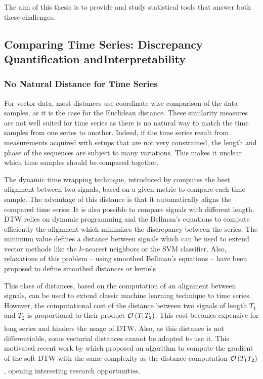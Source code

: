 \documentclass[../thesis.tex]{subfiles}
\begin{document}
The aim of this thesis is to provide and study statistical tools that answer both these challenges.




\subsection[Comparing Time Series: Discrepancy Quantification and\\Interpretability]{%
			Comparing Time Series: Discrepancy Quantification and\linebreak[1]Interpretability}
\label{sub:ts_stat}


\subsubsection{No Natural Distance for Time Series}
\label{ssub:ts:no_dist}


For vector data, most distances use coordinate-wise comparison of the data samples, as it is the case for the Euclidean distance. These similarity measures are not well suited for time series as there is no natural way to match the time samples from one series to another. Indeed, if the time series result from measurements acquired with setups that are not very constrained, the length and phase of the sequences are subject to many variations. This makes it unclear which time samples should be compared together.



The dynamic time wrapping technique, introduced by \citet{Sakoe1971} computes the best alignment between two signals, based on a given metric to compare each time sample. The advantage of this distance is that it automatically aligns the compared time series. It is also possible to compare signals with different length. DTW relies on dynamic programming and the Bellman's equations \citep{Bellman1952} to compute efficiently the alignment which minimizes the discrepancy between the series. The minimum value defines a distance between signals which can be used to extend vector methods like the $k$-nearest neighbors or the SVM classifier. Also, relaxations of this problem -- using smoothed Bellman's equations -- have been proposed to define smoothed distances \citep{Bahl1975} or kernels \citep{Saigo2004}.


This class of distances, based on the computation of an alignment between signals, can be used to extend classic machine learning technique to time series. However, the computational cost of the distance between two signals of length $T_1$ and $T_2$ is proportional to their product \ie{} $\underset{}{\mathcal O}\left(T_1T_2\right)$. This cost becomes expensive for long series and hinders the usage of DTW. Also, as this distance is not differentiable, some vectorial distances cannot be adapted to use it. This motivated recent work by \citet{Cuturi2017} which proposed an algorithm to compute the gradient of the soft-DTW with the same complexity as the distance computation $\underset{}{\mathcal O}\left(T_1T_2\right)$, opening interesting research opportunities.
\end{document}

